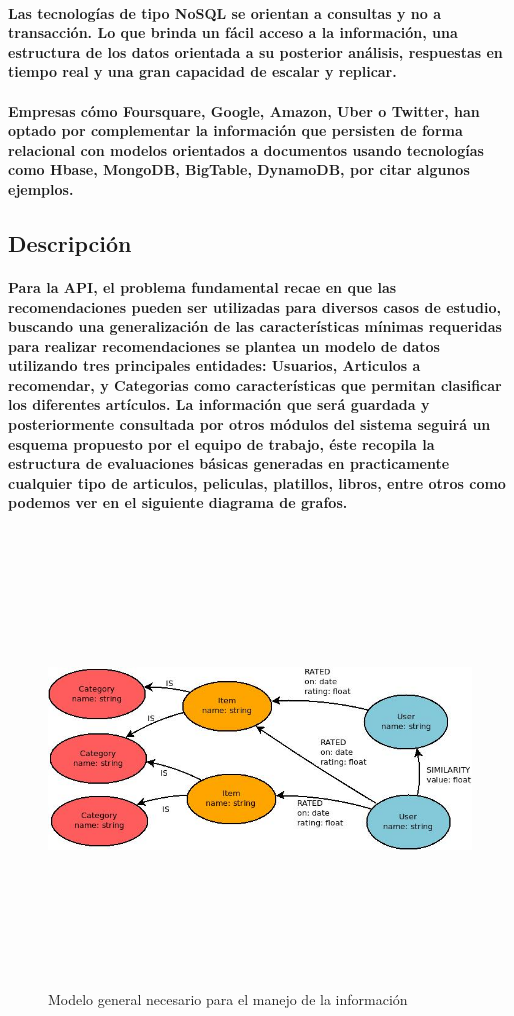 \paragraph{Las tecnologías de tipo NoSQL se orientan a consultas y no a transacción. Lo que brinda un fácil acceso a la información, una estructura de los datos orientada a su posterior análisis, respuestas en tiempo real y una gran capacidad de escalar y replicar.}

\paragraph{Empresas cómo Foursquare, Google, Amazon, Uber o Twitter, han optado por complementar la información que persisten de forma relacional con modelos orientados a documentos usando tecnologías como Hbase, MongoDB, BigTable, DynamoDB, por citar algunos ejemplos.}

\subsection{Descripción}

\paragraph{Para la API, el problema fundamental recae en que las recomendaciones pueden ser utilizadas para diversos casos de estudio, buscando una generalización de las características mínimas requeridas para realizar recomendaciones se plantea un modelo de datos utilizando tres principales entidades: Usuarios, Articulos a recomendar, y Categorias como características que permitan clasificar los diferentes artículos. La información que será guardada y posteriormente consultada por otros módulos del sistema seguirá un esquema propuesto por el equipo de trabajo, éste recopila la estructura de evaluaciones básicas generadas en practicamente cualquier tipo de articulos, peliculas, platillos, libros, entre otros como podemos ver en el siguiente diagrama de grafos.}

\newpage
    \begin{landscape}
      \begin{figure}[h!]
      \centering
      \includegraphics[width=22.5cm,height=12cm]{./images/Diagrama_general_datos.jpg}
      \caption{Modelo general necesario para el manejo de la información}
    \end{figure}
    \end{landscape}
  \newpage
